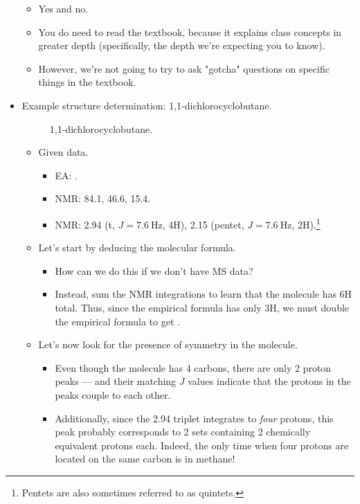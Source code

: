 \documentclass[../notes.tex]{subfiles}
\begin{document}
\begin{itemize}
\begin{itemize}
        \item Yes and no.
        \item You do need to read the textbook, because it explains class concepts in greater depth (specifically, the depth we're expecting you to know).
        \item However, we're not going to try to ask "gotcha" questions on specific things in the textbook.
    \end{itemize}
    \pagebreak
    \item Example structure determination: 1,1-dichlorocyclobutane.
    \begin{figure}[h!]
        \centering
        \footnotesize
        \caption{1,1-dichlorocyclobutane.}
        \label{fig:dichlorocyclobutane}
    \end{figure}
    \begin{itemize}
        \item Given data.
        \begin{itemize}
            \item EA: .
            \item {} NMR: 84.1, 46.6, 15.4.
            \item {} NMR: 2.94 (t, $J=\SI{7.6}{\hertz}$, 4H), 2.15 (pentet, $J=\SI{7.6}{\hertz}$, 2H).\footnote{Pentets are also sometimes referred to as quintets.}
        \end{itemize}
        \item Let's start by deducing the molecular formula.
        \begin{itemize}
            \item How can we do this if we don't have MS data?
            \item Instead, sum the  NMR integrations to learn that the molecule has 6H total. Thus, since the empirical formula has only 3H, we must double the empirical formula to get .
        \end{itemize}
        \item Let's now look for the presence of symmetry in the molecule.
        \begin{itemize}
            \item Even though the molecule has 4 carbons, there are only 2 proton peaks --- and their matching $J$ values indicate that the protons in the peaks couple to each other.
            \item Additionally, since the 2.94 triplet integrates to \emph{four} protons, this peak probably corresponds to 2 sets containing 2 chemically equivalent protons each. Indeed, the only time when four protons are located on the same carbon is in methane!

\end{itemize}
\end{itemize}
\end{itemize}
\end{document}
